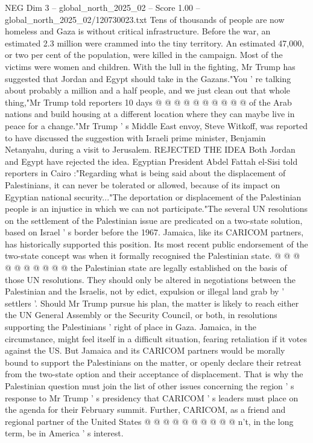 \begin{textsample}{NEG Dim 3 – global\_north\_2025\_02 – Score 1.00 – global\_north\_2025\_02/120730023.txt}
Tens of thousands of people are now homeless and Gaza is without critical infrastructure.
Before the war, an estimated 2.3 million were crammed into the tiny territory.
An estimated 47,000, or two per cent of the population, were killed in the campaign.
Most of the victims were women and children.
With the lull in the fighting, Mr Trump has suggested that Jordan and Egypt should take in the Gazans."You ' re talking about probably a million and a half people, and we just clean out that whole thing,"Mr Trump told reporters 10 days @ @ @ @ @ @ @ @ @ @ of the Arab nations and build housing at a different location where they can maybe live in peace for a change."Mr Trump ' s Middle East envoy, Steve Witkoff, was reported to have discussed the suggestion with Israeli prime minister, Benjamin Netanyahu, during a visit to Jerusalem.
REJECTED THE IDEA Both Jordan and Egypt have rejected the idea.
Egyptian President Abdel Fattah el-Sisi told reporters in Cairo :"Regarding what is being said about the displacement of Palestinians, it can never be tolerated or allowed, because of its impact on Egyptian national security..."The deportation or displacement of the Palestinian people is an injustice in which we can not participate."The several UN resolutions on the settlement of the Palestinian issue are predicated on a two-state solution, based on Israel ' s border before the 1967.
Jamaica, like its CARICOM partners, has historically supported this position.
Its most recent public endorsement of the two-state concept was when it formally recognised the Palestinian state. @ @ @ @ @ @ @ @ @ @ the Palestinian state are legally established on the basis of those UN resolutions.
They should only be altered in negotiations between the Palestinian and the Israelis, not by edict, expulsion or illegal land grab by ' settlers '.
Should Mr Trump pursue his plan, the matter is likely to reach either the UN General Assembly or the Security Council, or both, in resolutions supporting the Palestinians ' right of place in Gaza.
Jamaica, in the circumstance, might feel itself in a difficult situation, fearing retaliation if it votes against the US.
But Jamaica and its CARICOM partners would be morally bound to support the Palestinians on the matter, or openly declare their retreat from the two-state option and their acceptance of displacement.
That is why the Palestinian question must join the list of other issues concerning the region ' s response to Mr Trump ' s presidency that CARICOM ' s leaders must place on the agenda for their February summit.
Further, CARICOM, as a friend and regional partner of the United States @ @ @ @ @ @ @ @ @ @ n't, in the long term, be in America ' s interest.

\end{textsample}
